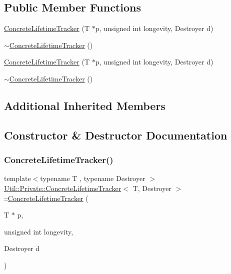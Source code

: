 \subsection*{Public Member Functions}
\begin{DoxyCompactItemize}
\item 
\mbox{\hyperlink{classUtil_1_1Private_1_1ConcreteLifetimeTracker_a57e26a2e72542caf98f691f0972718d1}{Concrete\+Lifetime\+Tracker}} (T $\ast$p, unsigned int longevity, Destroyer d)
\item 
\mbox{\hyperlink{classUtil_1_1Private_1_1ConcreteLifetimeTracker_a46aa326f024ef9d7301b84af803c5fb0}{$\sim$\+Concrete\+Lifetime\+Tracker}} ()
\item 
\mbox{\hyperlink{classUtil_1_1Private_1_1ConcreteLifetimeTracker_a57e26a2e72542caf98f691f0972718d1}{Concrete\+Lifetime\+Tracker}} (T $\ast$p, unsigned int longevity, Destroyer d)
\item 
\mbox{\hyperlink{classUtil_1_1Private_1_1ConcreteLifetimeTracker_a46aa326f024ef9d7301b84af803c5fb0}{$\sim$\+Concrete\+Lifetime\+Tracker}} ()
\end{DoxyCompactItemize}
\subsection*{Additional Inherited Members}


\subsection{Constructor \& Destructor Documentation}
\mbox{\label{classUtil_1_1Private_1_1ConcreteLifetimeTracker_a57e26a2e72542caf98f691f0972718d1}} 
\subsubsection{\texorpdfstring{ConcreteLifetimeTracker()}{ConcreteLifetimeTracker()}\hspace{0.1cm}{\footnotesize\ttfamily [1/2]}}
{\footnotesize\ttfamily template$<$typename T , typename Destroyer $>$ \\
\mbox{\hyperlink{classUtil_1_1Private_1_1ConcreteLifetimeTracker}{Util\+::\+Private\+::\+Concrete\+Lifetime\+Tracker}}$<$ T, Destroyer $>$\+::\mbox{\hyperlink{classUtil_1_1Private_1_1ConcreteLifetimeTracker}{Concrete\+Lifetime\+Tracker}} (\begin{DoxyParamCaption}\item[{T $\ast$}]{p,  }\item[{unsigned int}]{longevity,  }\item[{Destroyer}]{d }\end{DoxyParamCaption})\hspace{0.3cm}{\ttfamily [inline]}}

